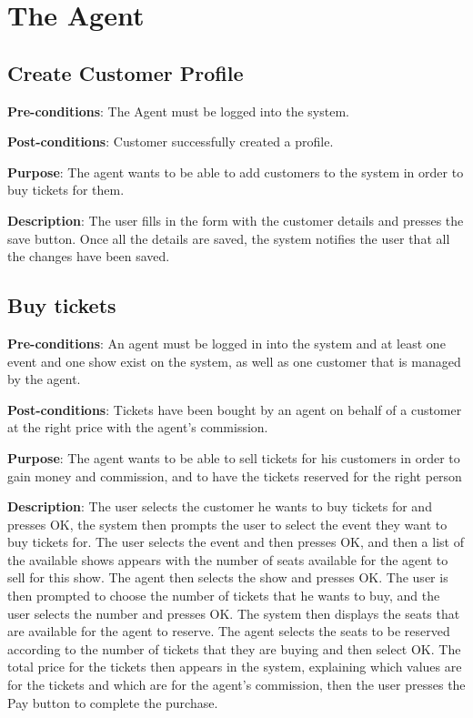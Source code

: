 \section{The Agent}

\subsection{Create Customer Profile}
\textbf{Pre-conditions}: The Agent must be logged into the system.

\textbf{Post-conditions}: Customer successfully created a profile.

\textbf{Purpose}: The agent wants to be able to add customers to the system in order to buy tickets for them.

\textbf{Description}: The user fills in the form with the customer details and presses the save button. Once all the details are saved, the system notifies the user that all the changes have been saved.

\subsection{Buy tickets}
\textbf{Pre-conditions}: An agent must be logged in into the system and at least one event and one show exist on the system, as well as one customer that is managed by the agent.

\textbf{Post-conditions}: Tickets have been bought by an agent on behalf of a customer at the right price with the agent's commission.

\textbf{Purpose}: The agent wants to be able to sell tickets for his customers in order to gain money and commission, and to have the tickets reserved for the right person

\textbf{Description}: The user selects the customer he wants to buy tickets for and presses OK, the system then prompts the user to select the event they want to buy tickets for. The user selects the event and then presses OK, and then a list of the available shows appears with the number of seats available for the agent to sell for this show. The agent then selects the show and presses OK. The user is then prompted to choose the number of tickets that he wants to buy, and the user selects the number and presses OK. The system then displays the seats that are available for the agent to reserve. The agent selects the seats to be reserved according to the number of tickets that they are buying and then select OK. The total price for the tickets then appears in the system, explaining which values are for the tickets and which are for the agent's commission, then the user presses the Pay button to complete the purchase.

